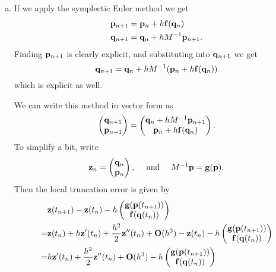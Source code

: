 \FloatBarrier

\begin{solution}
  \begin{enumerate}[(a)]
    \item If we apply the symplectic Euler method we get
    \begin{align*}
      \mathbf{p}_{n+1} &= \mathbf{p}_n + h \mathbf{f}(\mathbf{q}_n) \\
      \mathbf{q}_{n+1} &= \mathbf{q}_n + h M^{-1} \mathbf{p}_{n+1}.
    \end{align*}
    Finding $\mathbf{p}_{n+1}$ is clearly explicit, and substituting into $\mathbf{q}_{n+1}$ we get
    \[
      \mathbf{q}_{n+1} = \mathbf{q}_n + h M^{-1}(\mathbf{p}_n + h \mathbf{f}(\mathbf{q}_n))
    \]
    which is explicit as well.
  
    We can write this method in vector form as 
    \[
      \begin{pmatrix}
        \mathbf{q}_{n+1} \\ \mathbf{p}_{n+1}
      \end{pmatrix}
      =
      \begin{pmatrix}
        \mathbf{q}_n + h M^{-1} \mathbf{p}_{n+1} \\
        \mathbf{p}_n + h \mathbf{f}(\mathbf{q}_n)
      \end{pmatrix}.
    \]
    To simplify a bit, write
    \[
      \mathbf{z}_n = 
      \begin{pmatrix}
        \mathbf{q}_n \\ \mathbf{p}_n
      \end{pmatrix},
      \quad\text{ and }\quad 
      M^{-1} \mathbf{p} = \mathbf{g}(\mathbf{p}).
    \]
    Then the local truncation error is given by
    \begin{align*}
      &\mb z(t_{n+1}) - \mb z(t_n) - h
      \begin{pmatrix}
        \mb g(\mb p(t_{n+1})) \\
        \mb f(\mb q(t_n))
      \end{pmatrix} \\
      = & \mb z(t_n) + h\mb z'(t_n) + \frac{h^2}{2}\mb z''(t_n) + \mb O(h^3) - \mb z(t_n) - h
      \begin{pmatrix}
        \mb g(\mb p(t_{n+1})) \\
        \mb f(\mb q(t_n))
      \end{pmatrix} \\
      = & h \mb z'(t_n) + \frac{h^2}{2}\mb z''(t_n) + \mb O(h^3) - h
      \begin{pmatrix}
        \mb g(\mb p(t_{n+1})) \\
        \mb f(\mb q(t_n))
      \end{pmatrix} \\

\end{align*}
\end{enumerate}
\end{solution}
